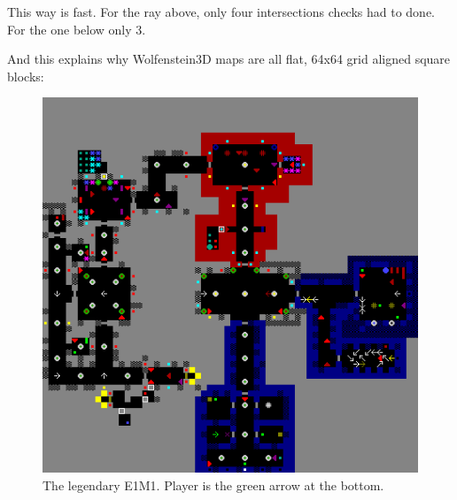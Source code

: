 This way is fast. For the ray above, only four intersections checks had to done. For the one below only 3.\\
\par
And this explains why Wolfenstein3D maps are all flat, 64x64 grid aligned square blocks:\\
\par

\begin{figure}[H]
  \centering
 \includegraphics[width=\textwidth]{imgs/e1m1.png}
 \caption{The legendary E1M1. Player is the green arrow at the bottom.}
\end{figure}




